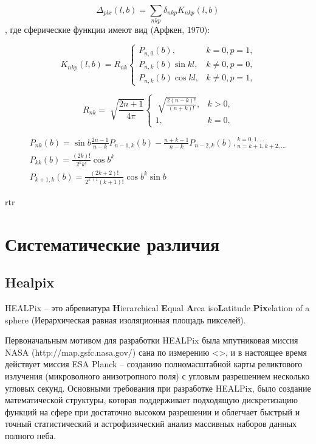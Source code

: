 \documentclass[14pt]{article} %
\begin{document}
$$ \Delta_{plx} (l,b) = \sum_{nkp}\delta_{nkp}K_{nkp}(l,b) $$,
где сферические функции имеют вид (Арфкен, 1970):

\begin{equation}
K_{nkp}(l,b) = R_{nk} \left\{ \begin{array}{ll}
P_{n,0}(b), & \textrm{$k=0, p=1$,}\\
P_{n,k}(b)\sin{kl}, & \textrm{$k\neq0, p=0$,}\\
P_{n,k}(b)\cos{kl}, & \textrm{$k\neq0, p=1$,}
\end{array} \right.
\end{equation}

\begin{equation}
R_{nk} = \sqrt[]{\frac{2n+1}{4\pi}} \left\{ \begin{array}{cc}
\sqrt[]{\frac{2(n-k)!}{(n+k)!}}, & \textrm{$k>0$,}\\
1, & \textrm{$k=0$,}
\end{array} \right.
\end{equation}

\begin{equation}
\begin{array}{ll}
P_{nk}(b)=\sin{b\frac{2n-1}{n-k}}P_{n-1,k}(b)-\frac{n+k-1}{n-k}P_{n-2,k}(b),{}^{k=0,1,...}_{n=k+1,k+2,...}\\
P_{kk}(b)=\frac{(2k)!}{2^{k}k!}{\cos{b}}^{k}\\
P_{k+1,k}(b)=\frac{(2k+2)!}{2^{k+1}(k+1)!}{\cos{b}}^{k}\sin{b}
\end{array}
\end{equation}

rtr

\section{Систематические различия}\label{sistem}
		

\subsection{Healpix}\label{sub:smthhealpix}
HEALPix -- это абревиатура \textbf{H}ierarchical \textbf{E}qual \textbf{A}rea iso\textbf{L}atitude \textbf{Pix}elation of a sphere (Иерархическая равная изоляционная площадь пикселей). 

Первоначальным мотивом для разработки HEALPix была мпутниковая миссия NASA (http://map.gsfc.nasa.gov/) сана по измерению <>, и в настоящее время действует миссия ESA Planck -- созданию полномасштабной карты реликтового излучения (микроволного анизотропного поля) с угловым разрешением несколько угловых секунд. Основными требования при разработке HEALPix, было создание математической структуры, которая поддерживает подходящую дискретизацию функций на сфере при достаточно высоком разрешении и облегчает быстрый и точный статистический и астрофизический анализ массивных наборов данных полного неба.
\end{document}
